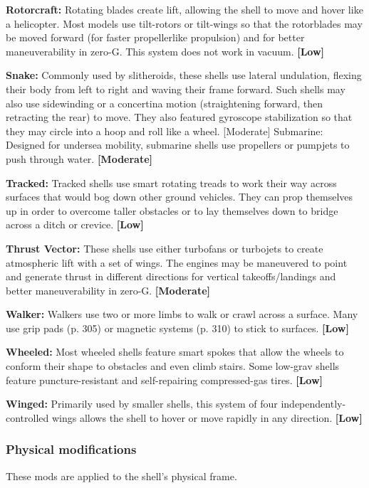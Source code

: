 \textbf{Rotorcraft:} Rotating blades create lift, allowing the shell to move and hover like a helicopter. Most models use tilt-rotors or tilt-wings so that the rotorblades may be moved forward (for faster propellerlike propulsion) and for better maneuverability in zero-G. This system does not work in vacuum. \textbf{[Low]}

\textbf{Snake:} Commonly used by slitheroids, these shells use lateral undulation, flexing their body from left to right and waving their frame forward. Such shells may also use sidewinding or a concertina motion (straightening forward, then retracting the rear) to move. They also featured gyroscope stabilization so that they may circle into a hoop and roll like a wheel. [Moderate] Submarine: Designed for undersea mobility, submarine shells use propellers or pumpjets to push through water. \textbf{[Moderate]}

\textbf{Tracked:} Tracked shells use smart rotating treads to work their way across surfaces that would bog down other ground vehicles. They can prop themselves up in order to overcome taller obstacles or to lay themselves down to bridge across a ditch or crevice. \textbf{[Low]}

\textbf{Thrust Vector:} These shells use either turbofans or turbojets to create atmospheric lift with a set of wings. The engines may be maneuvered to point and generate thrust in different directions for vertical takeoffs/landings and better maneuverability in zero-G. \textbf{[Moderate]}

\textbf{Walker:} Walkers use two or more limbs to walk or crawl across a surface. Many use grip pads (p. 305) or magnetic systems (p. 310) to stick to surfaces. \textbf{[Low]}

\textbf{Wheeled:} Most wheeled shells feature smart spokes that allow the wheels to conform their shape to obstacles and even climb stairs. Some low-grav shells feature puncture-resistant and self-repairing compressed-gas tires. \textbf{[Low]}

\textbf{Winged:} Primarily used by smaller shells, this system of four independently-controlled wings allows the shell to hover or move rapidly in any direction. \textbf{[Low]}

\subsubsection{Physical modifications}

These mods are applied to the shell’s physical frame.

